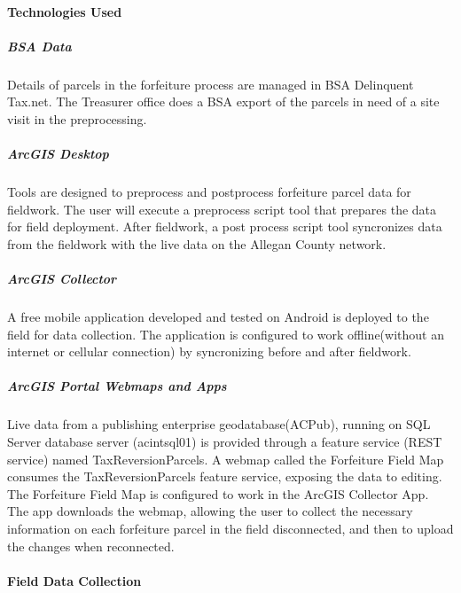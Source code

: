 \documentclass[class=article , crop=false, titlepage, twoside, multi={itemize, figure, verbatim}, float=false]{standalone}
\begin{document}
\medskip \paragraph{Technologies Used}
\subparagraph{BSA Data}Details of parcels in the forfeiture process are managed in BSA Delinquent Tax.net.  The Treasurer office does a BSA export of the parcels in need of a site visit in the preprocessing.

\subparagraph{ArcGIS Desktop}Tools are designed to preprocess and postprocess forfeiture parcel data for fieldwork.  The user will execute a preprocess script tool that prepares the data for field deployment.  After fieldwork, a post process script tool syncronizes data from the fieldwork with the live data on the Allegan County network. 

\subparagraph{ArcGIS Collector}A free mobile application developed and tested on Android is deployed to the field for data collection.  The application is configured to work offline(without an internet or cellular connection) by syncronizing before and after fieldwork.

\subparagraph{ArcGIS Portal Webmaps and Apps}Live data from a publishing enterprise geodatabase(ACPub), running on SQL Server database server (acintsql01) is provided through a feature service (REST service)  named TaxReversionParcels.  A webmap called the Forfeiture Field Map consumes the TaxReversionParcels feature service, exposing the data to editing.  The Forfeiture Field Map is configured to work in the ArcGIS Collector App.  The app downloads the webmap, allowing the user to collect the necessary information on each forfeiture parcel in the field disconnected, and then to upload the changes when reconnected. 

\paragraph{Field Data Collection}
\end{document}
